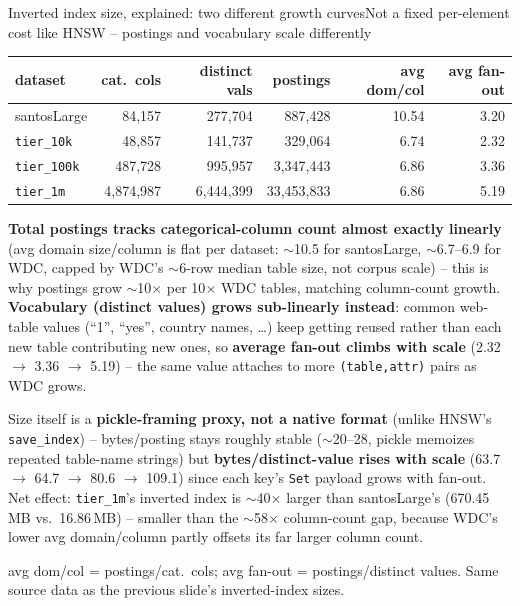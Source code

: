 \documentclass[aspectratio=169,10pt]{beamer}
\newcommand{\highlight}[1]{{\color{Cat1}\bfseries #1}}
\newcommand{\bad}[1]{{\color{CriticalC}\bfseries #1}}
\begin{document}
\begin{frame}{Inverted index size, explained: two different growth curves}{Not a fixed per-element cost like HNSW -- postings and vocabulary scale differently}
\footnotesize
\begin{center}
\begin{tabular}{lrrrrr}
\toprule
dataset & cat.\ cols & distinct vals & postings & avg dom/col & avg fan-out \\
\midrule
santosLarge & 84{,}157 & 277{,}704 & 887{,}428 & 10.54 & 3.20 \\
\texttt{tier\_10k} & 48{,}857 & 141{,}737 & 329{,}064 & 6.74 & 2.32 \\
\texttt{tier\_100k} & 487{,}728 & 995{,}957 & 3{,}347{,}443 & 6.86 & 3.36 \\
\texttt{tier\_1m} & 4{,}874{,}987 & 6{,}444{,}399 & 33{,}453{,}833 & 6.86 & 5.19 \\
\bottomrule
\end{tabular}
\end{center}

\vspace{6pt}
\highlight{Total postings tracks categorical-column count almost exactly linearly} (avg domain size/column is flat per dataset: $\sim$10.5 for santosLarge, $\sim$6.7--6.9 for WDC, capped by WDC's $\sim$6-row median table size, not corpus scale) -- this is why postings grow $\sim$10$\times$ per 10$\times$ WDC tables, matching column-count growth. \highlight{Vocabulary (distinct values) grows sub-linearly instead}: common web-table values (``1'', ``yes'', country names, \ldots) keep getting reused rather than each new table contributing new ones, so \highlight{average fan-out climbs with scale} (2.32 $\to$ 3.36 $\to$ 5.19) -- the same value attaches to more \texttt{(table,attr)} pairs as WDC grows.

\vspace{4pt}
Size itself is a \bad{pickle-framing proxy, not a native format} (unlike HNSW's \texttt{save\_index}) -- bytes/posting stays roughly stable ($\sim$20--28, pickle memoizes repeated table-name strings) but \highlight{bytes/distinct-value rises with scale} (63.7 $\to$ 64.7 $\to$ 80.6 $\to$ 109.1) since each key's \texttt{Set} payload grows with fan-out. Net effect: \texttt{tier\_1m}'s inverted index is $\sim$40$\times$ larger than santosLarge's (670.45\,MB vs.\ 16.86\,MB) -- smaller than the $\sim$58$\times$ column-count gap, because WDC's lower avg domain/column partly offsets its far larger column count.

\vspace{2pt}
{\footnotesize\color{Muted} avg dom/col = postings/cat.\ cols; avg fan-out = postings/distinct values. Same source data as the previous slide's inverted-index sizes.}
\end{frame}
\end{document}
